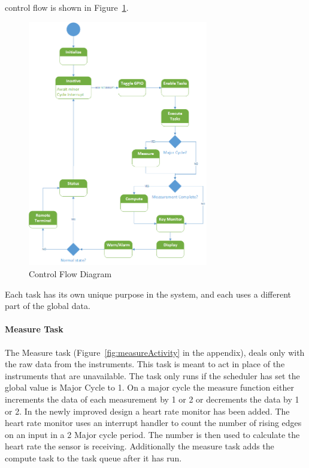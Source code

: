 \documentclass[12pt]{article} %
\begin{document}
    control flow is shown in Figure~\ref{fig:Control}. 

    \begin{figure}[h]
      \centering
      \includegraphics[width=0.7\textwidth]{../design/Control_state_diagram.png}
      \caption{Control Flow Diagram}
      \label{fig:Control}
    \end{figure}

    Each task has its own unique purpose in the system, and each uses a different
    part of the global data.

\paragraph{Measure Task} The Measure task (Figure~\ref{fig:measureActivity}
    in the appendix), deals only with the raw data from the instruments. This
    task is meant to act in place of the instruments that are unavailable. The
    task only runs if the scheduler has set the global value is Major Cycle to
    1. On a major cycle the measure function either increments the data of each
    measurement by 1 or 2 or decrements the data by 1 or 2. In the newly
    improved design a heart rate monitor has been added. The heart rate monitor
    uses an interrupt handler to count the number of rising edges on an input
    in a 2 Major cycle period. The number is then used to calculate the heart
    rate the sensor is receiving. Additionally the measure task adds the
    compute task to the task queue after it has run.
\end{document}
